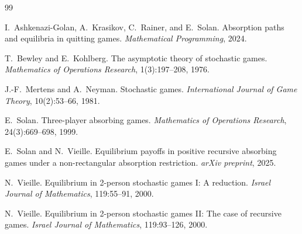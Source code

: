 \documentclass[12pt,a4paper]{article}
\theoremstyle{definition}
\begin{document}
\begin{thebibliography}{99}

I.~Ashkenazi-Golan, A.~Krasikov, C.~Rainer, and E.~Solan.
\newblock Absorption paths and equilibria in quitting games.
\newblock \emph{Mathematical Programming}, 2024.

T.~Bewley and E.~Kohlberg.
\newblock The asymptotic theory of stochastic games.
\newblock \emph{Mathematics of Operations Research}, 1(3):197--208, 1976.

J.-F.~Mertens and A.~Neyman.
\newblock Stochastic games.
\newblock \emph{International Journal of Game Theory}, 10(2):53--66, 1981.

E.~Solan.
\newblock Three-player absorbing games.
\newblock \emph{Mathematics of Operations Research}, 24(3):669--698, 1999.

E.~Solan and N.~Vieille.
\newblock Equilibrium payoffs in positive recursive absorbing games under a non-rectangular absorption restriction.
\newblock \emph{arXiv preprint}, 2025.

N.~Vieille.
\newblock Equilibrium in 2-person stochastic games I: A reduction.
\newblock \emph{Israel Journal of Mathematics}, 119:55--91, 2000.

N.~Vieille.
\newblock Equilibrium in 2-person stochastic games II: The case of recursive games.
\newblock \emph{Israel Journal of Mathematics}, 119:93--126, 2000.

\end{thebibliography}
\end{document}
